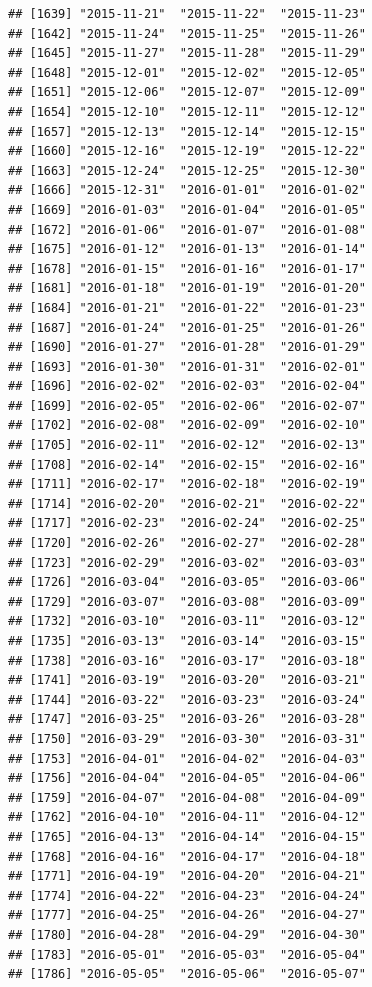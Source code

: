 \documentclass[10pt]{article}\usepackage[]{graphicx}\usepackage[]{color}
\makeatletter
\newenvironment{kframe}{%
 \def\at@end@of@kframe{}%
 \ifinner\ifhmode%
  \def\at@end@of@kframe{\end{minipage}}%
  \begin{minipage}{\columnwidth}%
 \fi\fi%
 \def\FrameCommand##1{\hskip\@totalleftmargin \hskip-\fboxsep
 \colorbox{shadecolor}{##1}\hskip-\fboxsep
     \hskip-\linewidth \hskip-\@totalleftmargin \hskip\columnwidth}%
 \MakeFramed {\advance\hsize-\width
   \@totalleftmargin\z@ \linewidth\hsize
   \@setminipage}}%
 {\par\unskip\endMakeFramed%
 \at@end@of@kframe}
\newenvironment{knitrout}{}{} %
\theoremstyle{plain}
\makeatother
\begin{document}
\begin{knitrout}
\begin{kframe}
\begin{verbatim}
## [1639] "2015-11-21"  "2015-11-22"  "2015-11-23" 
## [1642] "2015-11-24"  "2015-11-25"  "2015-11-26" 
## [1645] "2015-11-27"  "2015-11-28"  "2015-11-29" 
## [1648] "2015-12-01"  "2015-12-02"  "2015-12-05" 
## [1651] "2015-12-06"  "2015-12-07"  "2015-12-09" 
## [1654] "2015-12-10"  "2015-12-11"  "2015-12-12" 
## [1657] "2015-12-13"  "2015-12-14"  "2015-12-15" 
## [1660] "2015-12-16"  "2015-12-19"  "2015-12-22" 
## [1663] "2015-12-24"  "2015-12-25"  "2015-12-30" 
## [1666] "2015-12-31"  "2016-01-01"  "2016-01-02" 
## [1669] "2016-01-03"  "2016-01-04"  "2016-01-05" 
## [1672] "2016-01-06"  "2016-01-07"  "2016-01-08" 
## [1675] "2016-01-12"  "2016-01-13"  "2016-01-14" 
## [1678] "2016-01-15"  "2016-01-16"  "2016-01-17" 
## [1681] "2016-01-18"  "2016-01-19"  "2016-01-20" 
## [1684] "2016-01-21"  "2016-01-22"  "2016-01-23" 
## [1687] "2016-01-24"  "2016-01-25"  "2016-01-26" 
## [1690] "2016-01-27"  "2016-01-28"  "2016-01-29" 
## [1693] "2016-01-30"  "2016-01-31"  "2016-02-01" 
## [1696] "2016-02-02"  "2016-02-03"  "2016-02-04" 
## [1699] "2016-02-05"  "2016-02-06"  "2016-02-07" 
## [1702] "2016-02-08"  "2016-02-09"  "2016-02-10" 
## [1705] "2016-02-11"  "2016-02-12"  "2016-02-13" 
## [1708] "2016-02-14"  "2016-02-15"  "2016-02-16" 
## [1711] "2016-02-17"  "2016-02-18"  "2016-02-19" 
## [1714] "2016-02-20"  "2016-02-21"  "2016-02-22" 
## [1717] "2016-02-23"  "2016-02-24"  "2016-02-25" 
## [1720] "2016-02-26"  "2016-02-27"  "2016-02-28" 
## [1723] "2016-02-29"  "2016-03-02"  "2016-03-03" 
## [1726] "2016-03-04"  "2016-03-05"  "2016-03-06" 
## [1729] "2016-03-07"  "2016-03-08"  "2016-03-09" 
## [1732] "2016-03-10"  "2016-03-11"  "2016-03-12" 
## [1735] "2016-03-13"  "2016-03-14"  "2016-03-15" 
## [1738] "2016-03-16"  "2016-03-17"  "2016-03-18" 
## [1741] "2016-03-19"  "2016-03-20"  "2016-03-21" 
## [1744] "2016-03-22"  "2016-03-23"  "2016-03-24" 
## [1747] "2016-03-25"  "2016-03-26"  "2016-03-28" 
## [1750] "2016-03-29"  "2016-03-30"  "2016-03-31" 
## [1753] "2016-04-01"  "2016-04-02"  "2016-04-03" 
## [1756] "2016-04-04"  "2016-04-05"  "2016-04-06" 
## [1759] "2016-04-07"  "2016-04-08"  "2016-04-09" 
## [1762] "2016-04-10"  "2016-04-11"  "2016-04-12" 
## [1765] "2016-04-13"  "2016-04-14"  "2016-04-15" 
## [1768] "2016-04-16"  "2016-04-17"  "2016-04-18" 
## [1771] "2016-04-19"  "2016-04-20"  "2016-04-21" 
## [1774] "2016-04-22"  "2016-04-23"  "2016-04-24" 
## [1777] "2016-04-25"  "2016-04-26"  "2016-04-27" 
## [1780] "2016-04-28"  "2016-04-29"  "2016-04-30" 
## [1783] "2016-05-01"  "2016-05-03"  "2016-05-04" 
## [1786] "2016-05-05"  "2016-05-06"  "2016-05-07" 

\end{verbatim}
\end{kframe}
\end{knitrout}
\end{document}
